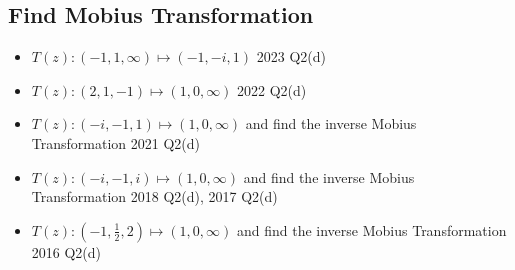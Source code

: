 \documentclass[a4paper, 8pt]{extarticle}
\begin{document}
\subsection{Find Mobius Transformation}
\begin{itemize}
    \item $T(z) : (-1, 1, \infty) \mapsto (-1, -i, 1)$ \hfill 2023 Q2(d)
    \item $T(z) : (2, 1, -1) \mapsto (1, 0, \infty)$    \hfill 2022 Q2(d)
    \item $T(z) : (-i, -1, 1) \mapsto (1, 0, \infty)$ and find the inverse Mobius Transformation \hfill 2021 Q2(d)
    \item $T(z) : (-i, -1, i) \mapsto (1, 0, \infty)$ and find the inverse Mobius Transformation \hfill 2018 Q2(d), 2017 Q2(d)
    \item $T(z) : (-1, \frac{1}{2}, 2) \mapsto (1, 0, \infty)$ and find the inverse Mobius Transformation \hfill 2016 Q2(d)
\end{itemize}
\end{document}
